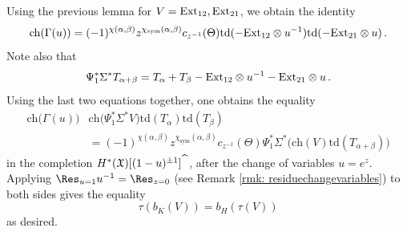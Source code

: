 \documentclass[12pt]{amsart}
\theoremstyle{definition}
\newcommand{\1}{\mathbf 1}
\newcommand{\FX}{{\mathfrak{X}}}
\newcommand{\Ext}{\mathcal{E}\text{xt}}
\newcommand{\ch}{\mathrm{ch}}
\newcommand{\td}{\mathrm{td}}
\newcommand{\sym}{\text{sym}}
\renewcommand{\Ext}{\textup{Ext}}
\begin{document}
Using the previous lemma for $V=\Ext_{12}, \Ext_{21}$, we obtain the identity
\[\ch(\Gamma(u))=(-1)^{\chi(\alpha, \beta)}z^{\chi_\sym(\alpha, \beta)}c_{z^{-1}}(\Theta)\td(-\Ext_{12}\otimes u^{-1})\td(-\Ext_{21}\otimes u)\,.\]
Note also that
\[\Psi_1^\ast\Sigma^\ast T_{\alpha+\beta}=T_\alpha+T_\beta-\Ext_{12}\otimes u^{-1}-\Ext_{21}\otimes u\,.\]
Using the last two equations together, one obtains the equality 
\begin{align*}\ch\big(\Gamma(u)\big)&\ch\big(\Psi_1^\ast \Sigma^\ast V\big)\td(T_{\alpha})\td(T_\beta)\\
&=(-1)^{\chi(\alpha, \beta)}z^{\chi_\sym(\alpha, \beta)}c_{z^{-1}}(\Theta)\Psi_1^\ast \Sigma^\ast \big(\ch(V)\td(T_{\alpha+\beta})\big)
\end{align*}
in the completion $H^\ast(\FX)[(1-u)^{\pm 1}]^{\widehat{\hspace{0.2cm}}}$, after the change of variables $u=e^z$. Applying $\Res_{u=1}u^{-1}=\Res_{z=0}$ (see Remark \ref{rmk: residuechangevariables}) to both sides gives the equality
\[\tau(b_K(V))=b_H(\tau(V))\]
as desired.
\end{document}
